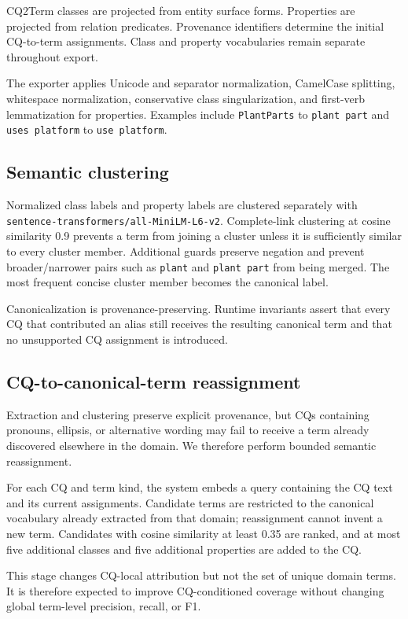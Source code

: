 \documentclass{ceurart}
\begin{document}
CQ2Term classes are projected from entity surface forms. Properties are
projected from relation predicates. Provenance identifiers determine the
initial CQ-to-term assignments. Class and property vocabularies remain
separate throughout export.

The exporter applies Unicode and separator normalization, CamelCase splitting,
whitespace normalization, conservative class singularization, and first-verb
lemmatization for properties. Examples include \texttt{PlantParts} to
\texttt{plant part} and \texttt{uses platform} to \texttt{use platform}.

\subsection{Semantic clustering}

Normalized class labels and property labels are clustered separately with
\texttt{sentence-transformers/all-MiniLM-L6-v2}. Complete-link clustering at
cosine similarity 0.9 prevents a term from joining a cluster unless it is
sufficiently similar to every cluster member. Additional guards preserve
negation and prevent broader/narrower pairs such as \texttt{plant} and
\texttt{plant part} from being merged. The most frequent concise cluster
member becomes the canonical label.

Canonicalization is provenance-preserving. Runtime invariants assert that
every CQ that contributed an alias still receives the resulting canonical
term and that no unsupported CQ assignment is introduced.

\subsection{CQ-to-canonical-term reassignment}

Extraction and clustering preserve explicit provenance, but CQs containing
pronouns, ellipsis, or alternative wording may fail to receive a term already
discovered elsewhere in the domain. We therefore perform bounded semantic
reassignment.

For each CQ and term kind, the system embeds a query containing the CQ text and
its current assignments. Candidate terms are restricted to the canonical
vocabulary already extracted from that domain; reassignment cannot invent a
new term. Candidates with cosine similarity at least 0.35 are ranked, and at
most five additional classes and five additional properties are added to the
CQ.

This stage changes CQ-local attribution but not the set of unique domain
terms. It is therefore expected to improve CQ-conditioned coverage without
changing global term-level precision, recall, or F1.
\end{document}
